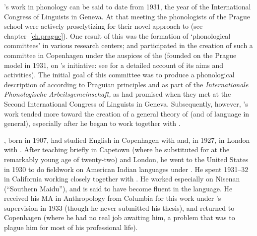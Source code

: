 {\Hjelmslev}'s work in phonology can be said to date from 1931, the year
of the {International Congress of Linguists} in Geneva. At that meeting
the phonologists of the Prague school were actively proselytizing for
their novel approach to  (see
chapter~\ref{ch.prague}). One result of this was the formation of
`phonological committees' in various research centers; and {\Hjelmslev}
participated in the creation of such a committee in Copenhagen under
the auspices of the  (founded on the
Prague model in 1931, on {\Hjelmslev}'s initiative: see
\citet{jensen.gregersen21:hjelmslev.jakobson} for a detailed account
of its aims and activities). The initial goal of this committee was
to produce a phonological description of  according to Praguian
principles and as part of the \emph{Internationale Phonologische
  Arbeitsgemeinschaft,} as {\Hjelmslev} had promised {\Jakobson} when they
met at the {Second International Congress of Linguists} in
Geneva. Subsequently, however, {\Hjelmslev}'s work tended more toward the
creation of a general theory of  (and of language in
general), especially after he began to work together with .

{\Uldall}, born in 1907, had studied {English} in Copenhagen with {\Jespersen}
and, in 1927, in London with . After teaching briefly in
Capetown (where he substituted for  at the remarkably young
age of twenty-two) and London, he went to the United States in 1930 to
do fieldwork on American Indian languages under {\Boas}. He spent
1931--32 in California working closely together with .
He worked especially on Nisenan (``Southern Maidu''), and is said to
have become fluent in the language. He received his MA in Anthropology
from Columbia for this work under {\Boas}'s supervision in 1933 (though
he never submitted his thesis), and returned to Copenhagen (where he
had no real job awaiting him, a problem that was to plague him for
most of his professional life).

